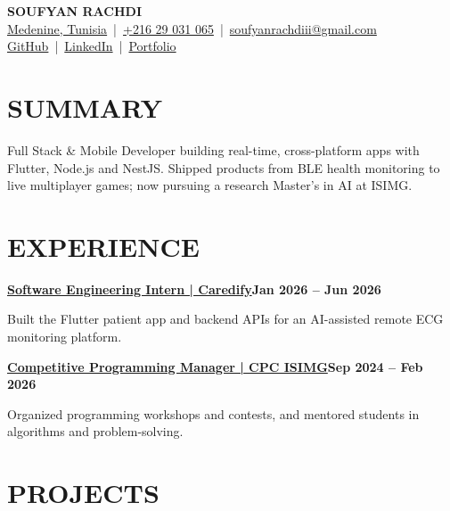 \documentclass[10pt,a4paper]{article}
\newcommand{\role}[2]{%
  \vspace{4pt}
  \textbf{#1}\hfill\textbf{#2}\par
}
\begin{document}
\begin{center}
  {\fontsize{24}{28}\selectfont\bfseries\color{accent} SOUFYAN RACHDI}\\[3pt]
  \href{https://maps.google.com/?q=Medenine%2C+Tunisia}{Medenine, Tunisia} \,|\, \href{https://wa.me/21629031065}{+216 29 031 065} \,|\,
  \href{mailto:soufyanrachdiii@gmail.com}{soufyanrachdiii@gmail.com}\\[2pt]
  \href{https://github.com/SoufyanRachdi}{GitHub} \,|\,
  \href{https://www.linkedin.com/in/soufyan-rachdi-996061247/}{LinkedIn} \,|\,
  \href{https://soufyanrachdi.vercel.app/}{Portfolio}
\end{center}

\section*{SUMMARY}
Full Stack \& Mobile Developer building real-time, cross-platform apps with Flutter, Node.js and NestJS. Shipped products from BLE health monitoring to live multiplayer games; now pursuing a research Master's in AI at ISIMG.

\section*{EXPERIENCE}
\role{\href{https://www.linkedin.com/company/caredify-396/posts/?feedView=all}{Software Engineering Intern | Caredify}}{Jan 2026 -- Jun 2026}
Built the Flutter patient app and backend APIs for an AI-assisted remote ECG monitoring platform.

\role{\href{https://www.facebook.com/profile.php?id=100087466104285}{Competitive Programming Manager | CPC ISIMG}}{Sep 2024 -- Feb 2026}
Organized programming workshops and contests, and mentored students in algorithms and problem-solving.

\section*{PROJECTS}
\end{document}
